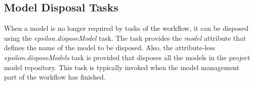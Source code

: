 \subsection{Model Disposal Tasks}

When a model is no longer required by tasks of the workflow, it can be disposed using the \emph{epsilon.disposeModel} task. The task provides the \emph{model} attribute that defines the name of the model to be disposed. Also, the attribute-less \emph{epsilon.disposeModels} task is provided that disposes all the models in the project model repository. This task is typically invoked when the model management part of the workflow has finished.